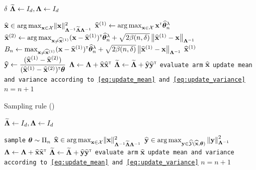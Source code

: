 \begin{algorithm}[ht]
\centering
\caption{\SLGapE}
\label{alg:slgape}
\begin{algorithmic}[1]
     $\delta$
     $\mathbf{\widetilde{\Lambda}} \leftarrow{} I_d, \mathbf{\Lambda}\leftarrow{} I_d$

        \State $\mathbf{\widehat{{\bf x}}}\in\operatorname*{arg\,max}_{{\bf x}\in\mathcal{X}}  \lVert{\bf x}\rVert_{\mathbf{\Lambda}^{-1} \mathbf{\widetilde{\Lambda}} \mathbf{\Lambda}^{-1} }^2$
        \State $\widehat{{\bf x}}^{(1)} \leftarrow \operatorname*{arg\,max}_{{\bf x}\in\mathcal{X}} {\bf x}^\mathsf{\scriptscriptstyle T}\widehat{{\boldsymbol \theta}}^{\lambda}_n$
        \State $\widehat{{\bf x}}^{(2)} \leftarrow \operatorname*{arg\,max}_{{\bf x}\neq\widehat{{\bf x}}^{(1)}} ({\bf x}-\widehat{{\bf x}}^{(1)})^\mathsf{\scriptscriptstyle T}\widehat{{\boldsymbol \theta}}^{\lambda}_n + \sqrt{2\beta(n,\delta)}\left\lVert\widehat{{\bf x}}^{(1)}-{\bf x}\right\rVert_{{\boldsymbol \Lambda}^{-1}}$
        \State $B_n \leftarrow \max_{{\bf x}\neq\widehat{{\bf x}}^{(1)}} ({\bf x}-\widehat{{\bf x}}^{(1)})^\mathsf{\scriptscriptstyle T}\widehat{{\boldsymbol \theta}}^{\lambda}_n + \sqrt{2\beta(n,\delta)}\left\lVert\widehat{{\bf x}}^{(1)}-{\bf x}\right\rVert_{{\boldsymbol \Lambda}^{-1}}$
            \State \Return $\widehat{{\bf x}}^{(1)}$
        \EndIf
        \State $\widehat{{\bf y}} \leftarrow{} \dfrac{(\widehat{{\bf x}}^{(1)}- \widehat{{\bf x}}^{(2)})}{(\widehat{{\bf x}}^{(1)}-\widehat{{\bf x}}^{(2)})^\mathsf{\scriptscriptstyle T}{\boldsymbol \theta}}$
        \State ${\boldsymbol \Lambda}\leftarrow{} \mathbf{\Lambda}+ \mathbf{\widehat{{\bf x}}}\mathbf{\widehat{{\bf x}}}^\mathsf{\scriptscriptstyle T}$
		\State $\mathbf{\widetilde{\Lambda}} \leftarrow{} \mathbf{\widetilde{\Lambda}} + \mathbf{\widehat{{\bf y}}}\mathbf{\widehat{{\bf y}}}^\mathsf{\scriptscriptstyle T}$
		\State \texttt{evaluate arm} $\widehat{{\bf x}}$
	    \State \texttt{update mean and variance according to \eqref{eq:update_mean} and \eqref{eq:update_variance}}
	    \State $n = n+1$
   \EndFor
\end{algorithmic}
\end{algorithm}

\begin{algorithm}[ht]
\centering
\caption{Sampling rule (\SLTCC)}
\label{alg:slt3c}
\begin{algorithmic}[1]
    $\mathbf{\widetilde{\Lambda}} \leftarrow{} I_d, \mathbf{\Lambda}\leftarrow{} I_d$

        \State \texttt{sample} ${\boldsymbol \theta} \sim \Pi_n$
        \State $\mathbf{\widehat{{\bf x}}}\in\operatorname*{arg\,max}_{{\bf x}\in\mathcal{X}}  \lVert{\bf x}\rVert_{\mathbf{\Lambda}^{-1} \mathbf{\widetilde{\Lambda}} \mathbf{\Lambda}^{-1} }^2$
        \State $\mathbf{\widehat{{\bf y}}}\in\operatorname*{arg\,max}_{{\bf y}\in\widehat{\mathcal{Y}}(\widehat{{\bf x}},{\boldsymbol \theta})}\left\lVert{\bf y}\right\rVert^2_{\mathbf{\Lambda}^{-1}}$
        \State $\mathbf{\Lambda}\leftarrow{} \mathbf{\Lambda}+ \mathbf{\widehat{{\bf x}}}\mathbf{\widehat{{\bf x}}}^\mathsf{\scriptscriptstyle T}$
		\State $\mathbf{\widetilde{\Lambda}} \leftarrow{} \mathbf{\widetilde{\Lambda}} + \mathbf{\widehat{{\bf y}}}\mathbf{\widehat{{\bf y}}}^\mathsf{\scriptscriptstyle T}$
		\State \texttt{evaluate arm} $\widehat{{\bf x}}$
	    \State \texttt{update mean and variance according to \eqref{eq:update_mean} and \eqref{eq:update_variance}}
	    \State $n = n+1$
   \EndFor
\end{algorithmic}
\end{algorithm}

